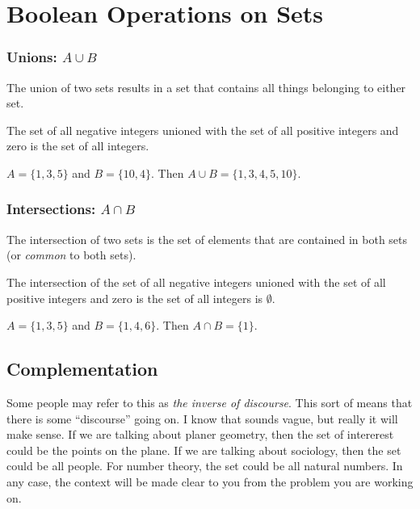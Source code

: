 \section{Boolean Operations on Sets}

\subsubsection{Unions: $A\cup B$}
The union of two sets results in a set that contains all things belonging to either set.

\begin{example}The set of all negative integers unioned with the set of all positive integers and zero is the set of all integers.
\end{example}

\begin{example}
$A = \{1, 3, 5  \}$ and $B = \{ 10, 4\}$.  Then $A\cup B = \{1, 3, 4, 5, 10 \}$.\end{example}


\subsubsection{Intersections: $A\cap B$}
The intersection of two sets is the set of elements that are contained in both sets (or \emph{common} to both sets).


\begin{example}The intersection of the set of all negative integers unioned with the set of all positive integers and zero is the set of all integers is $\emptyset$.
\end{example}

\begin{example}
$A = \{1, 3, 5  \}$ and $B = \{ 1, 4, 6\}$.  Then $A\cap B = \{1\}$.\end{example}

\subsection*{Complementation}
Some people may refer to this as \emph{the inverse of discourse}.  This sort of means that there is some ``discourse'' going on.  I know that sounds vague, but really it will make sense.  If we are talking about planer geometry, then the set of intererest could be the points on the plane.  If we are talking about sociology, then the set could be all people.  For number theory, the set could be all natural numbers. In any case, the context will be made clear to you from the problem you are working on.  

